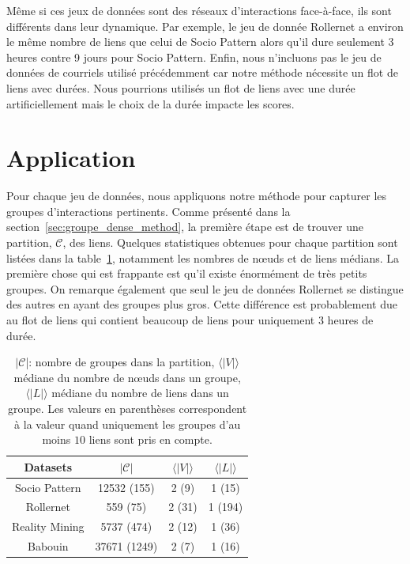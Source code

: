 Même si ces jeux de données sont des réseaux d'interactions face-à-face, ils sont différents dans leur dynamique.
Par exemple, le jeu de donnée Rollernet a environ le même nombre de liens que celui de Socio Pattern alors qu'il dure seulement 3 heures contre 9 jours pour Socio Pattern.
Enfin, nous n'incluons pas le jeu de données de courriels utilisé précédemment car notre méthode nécessite un flot de liens avec durées.
Nous pourrions utilisés un flot de liens avec une durée artificiellement mais le choix de la durée impacte les scores.



\section{Application}
\label{sec:groupe_dense_result}

Pour chaque jeu de données, nous appliquons notre méthode pour capturer les groupes d'interactions pertinents.
Comme présenté dans la section~\ref{sec:groupe_dense_method}, la première étape est de trouver une partition, $\mathcal{C}$, des liens.
Quelques statistiques obtenues pour chaque partition sont listées dans la table~\ref{tab:partition_spec_gd}, notamment les nombres de n\oe uds et de liens médians.
La première chose qui est frappante est qu'il existe énormément de très petits groupes.
On remarque également que seul le jeu de données Rollernet se distingue des autres en ayant des groupes plus gros.
Cette différence est probablement due au flot de liens qui contient beaucoup de liens pour uniquement 3 heures de durée.

\begin{table}
\centering
\begin{tabular}{|c|c|c|c|}
\hline \rule[-1ex]{0pt}{3.5ex}
Datasets & $|\mathcal{C}|$ & $\langle|V|\rangle$  & $\langle|L|\rangle$ \\
\hline
Socio Pattern & 12532 (155) & 2 (9) & 1 (15) \\
Rollernet& 559 (75) & 2 (31) & 1 (194) \\
Reality Mining & 5737 (474) & 2 (12) & 1 (36) \\
Babouin & 37671 (1249)  &  2 (7)  & 1 (16) \\
\hline
\end{tabular}
\caption{$|\mathcal{C}$|: nombre de groupes dans la partition, $\langle|V|\rangle$ médiane du nombre de n\oe uds dans un groupe, $\langle|L|\rangle$ médiane du nombre de liens dans un groupe.
Les valeurs en parenthèses correspondent à la valeur quand uniquement les groupes d'au moins $10$ liens sont pris en compte.}
\label{tab:partition_spec_gd}       %
\end{table}


